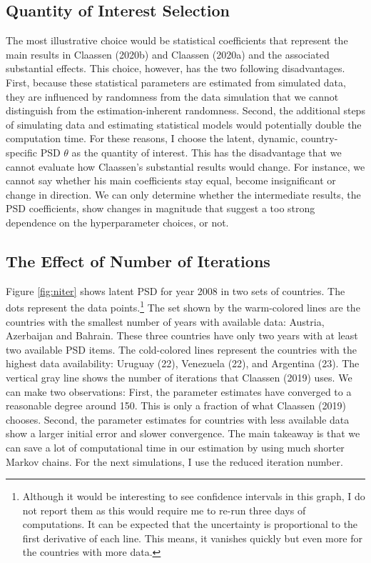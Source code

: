 \documentclass[12pt,english,a4paper,oneside]{article}
\theoremstyle{definition}
\theoremstyle{definition}
\theoremstyle{definition}
\theoremstyle{definition}
\theoremstyle{remark}
\begin{document}
\hypertarget{quantity-of-interest-selection}{%
\subsection{Quantity of Interest Selection}\label{quantity-of-interest-selection}}

The most illustrative choice would be statistical coefficients that represent the main results in Claassen (2020b) and Claassen (2020a) and the associated substantial effects. This choice, however, has the two following disadvantages. First, because these statistical parameters are estimated from simulated data, they are influenced by randomness from the data simulation that we cannot distinguish from the estimation-inherent randomness. Second, the additional steps of simulating data and estimating statistical models would potentially double the computation time. For these reasons, I choose the latent, dynamic, country-specific PSD \(\theta\) as the quantity of interest. This has the disadvantage that we cannot evaluate how Claassen's substantial results would change. For instance, we cannot say whether his main coefficients stay equal, become insignificant or change in direction. We can only determine whether the intermediate results, the PSD coefficients, show changes in magnitude that suggest a too strong dependence on the hyperparameter choices, or not.

\hypertarget{the-effect-of-number-of-iterations}{%
\subsection{The Effect of Number of Iterations}\label{the-effect-of-number-of-iterations}}

Figure \ref{fig:niter} shows latent PSD for year 2008 in two sets of countries. The dots represent the data points.\footnote{Although it would be interesting to see confidence intervals in this graph, I do not report them as this would require me to re-run three days of computations. It can be expected that the uncertainty is proportional to the first derivative of each line. This means, it vanishes quickly but even more for the countries with more data.} The set shown by the warm-colored lines are the countries with the smallest number of years with available data: Austria, Azerbaijan and Bahrain. These three countries have only two years with at least two available PSD items. The cold-colored lines represent the countries with the highest data availability: Uruguay (22), Venezuela (22), and Argentina (23). The vertical gray line shows the number of iterations that Claassen (2019) uses. We can make two observations: First, the parameter estimates have converged to a reasonable degree around 150. This is only a fraction of what Claassen (2019) chooses. Second, the parameter estimates for countries with less available data show a larger initial error and slower convergence. The main takeaway is that we can save a lot of computational time in our estimation by using much shorter Markov chains. For the next simulations, I use the reduced iteration number.
\end{document}
